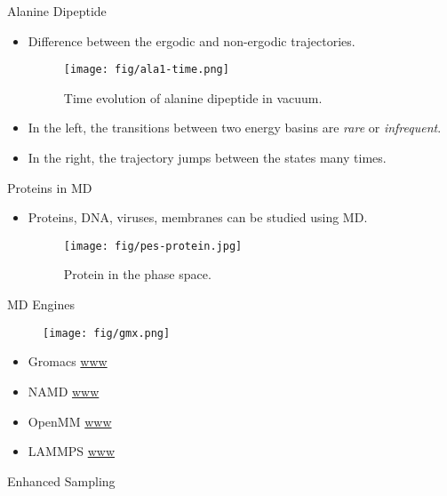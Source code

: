\documentclass[10pt]{beamer}
\begin{document}
\begin{frame}{Alanine Dipeptide}
\begin{itemize}
\setlength\itemsep{1em}
  \item Difference between the ergodic and non-ergodic trajectories.
  \begin{figure}
    \texttt{[image: fig/ala1-time.png]}
    \caption{Time evolution of alanine dipeptide in vacuum.}
  \end{figure}

  \item In the left, the transitions between two energy basins are \textit{rare} or \textit{infrequent}.

  \item In the right, the trajectory jumps between the states many times.
\end{itemize}
\end{frame}

\begin{frame}{Proteins in MD}
\begin{itemize}
\setlength\itemsep{1em}
  \item Proteins, DNA, viruses, membranes can be studied using MD.
  \begin{figure}
    \texttt{[image: fig/pes-protein.jpg]}
    \caption{Protein in the phase space.}
  \end{figure}
\end{itemize}
\end{frame}

\begin{frame}{MD Engines}
  \begin{figure}
    \texttt{[image: fig/gmx.png]}
  \end{figure}
\begin{itemize}
\setlength\itemsep{1em}
  \item Gromacs \url{www}
  \item NAMD \url{www}
  \item OpenMM \url{www}
  \item LAMMPS \url{www}
\end{itemize}
\end{frame}

\begin{frame}{}
  \begin{center}
    \fontsize{25pt}{6}\selectfont\vspace{1.2cm}
    \textcolor{subtitle}{Enhanced Sampling}
  \end{center}
\end{frame}

\end{document}
